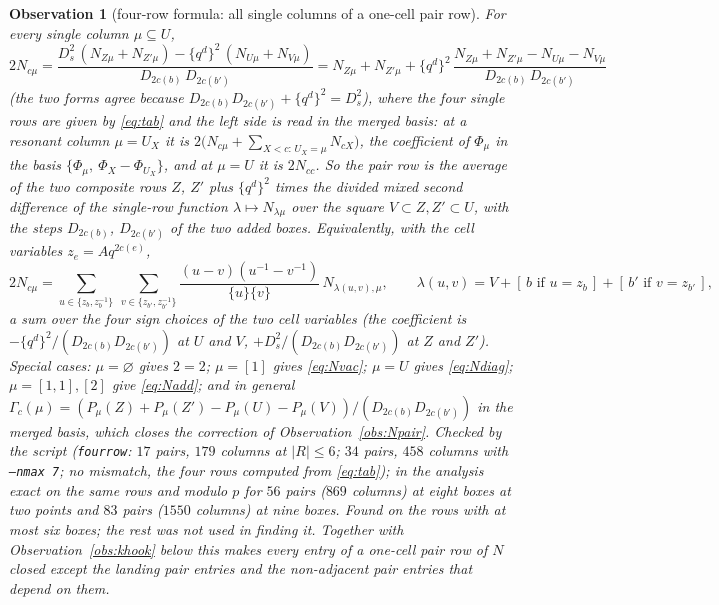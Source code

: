 \documentclass[11pt]{article}
\newtheorem{observation}{Observation}
\newcommand{\vac}{\varnothing}
\newcommand{\LMPH}[1]{\texttt{#1}}
\begin{document}
\begin{observation}[four-row formula: all single columns of a one-cell pair row]\label{obs:fourrow}
For every single column $\mu\subseteq U$,
\begin{equation}\label{eq:fourrow}
2N_{c\mu}=\frac{D_s^2\,(N_{Z\mu}+N_{Z'\mu})-\{q^d\}^2\,(N_{U\mu}+N_{V\mu})}{D_{2c(b)}\,D_{2c(b')}}
=N_{Z\mu}+N_{Z'\mu}+\{q^d\}^2\,\frac{N_{Z\mu}+N_{Z'\mu}-N_{U\mu}-N_{V\mu}}{D_{2c(b)}\,D_{2c(b')}}
\end{equation}
(the two forms agree because $D_{2c(b)}D_{2c(b')}+\{q^d\}^2=D_s^2$), where the four single rows are given by
\eqref{eq:tab} and the left side is read in the merged basis: at a resonant column $\mu=U_X$ it is
$2\bigl(N_{c\mu}+\sum_{X<c:\,U_X=\mu}N_{cX}\bigr)$, the coefficient of $\Phi_\mu$ in the basis
$\{\Phi_\mu,\ \Phi_X-\Phi_{U_X}\}$, and at $\mu=U$ it is $2N_{cc}$.  So the pair row is the average of the two
composite rows $Z$, $Z'$ plus $\{q^d\}^2$ times the divided mixed second difference of the single-row function
$\lambda\mapsto N_{\lambda\mu}$ over the square $V\subset Z,Z'\subset U$, with the steps $D_{2c(b)}$, $D_{2c(b')}$ of
the two added boxes.  Equivalently, with the cell variables $z_e=Aq^{2c(e)}$,
\begin{equation}\label{eq:signflip}
2N_{c\mu}=\sum_{u\in\{z_b,z_b^{-1}\}}\ \sum_{v\in\{z_{b'},z_{b'}^{-1}\}}\frac{(u-v)(u^{-1}-v^{-1})}{\{u\}\{v\}}\,
N_{\lambda(u,v),\mu},\qquad \lambda(u,v)=V+[\,b\text{ if }u=z_b\,]+[\,b'\text{ if }v=z_{b'}\,],
\end{equation}
a sum over the four sign choices of the two cell variables (the coefficient is $-\{q^d\}^2/(D_{2c(b)}D_{2c(b')})$ at
$U$ and $V$, $+D_s^2/(D_{2c(b)}D_{2c(b')})$ at $Z$ and $Z'$).  Special cases: $\mu=\vac$ gives $2=2$; $\mu=[1]$ gives
\eqref{eq:Nvac}; $\mu=U$ gives \eqref{eq:Ndiag}; $\mu=[1,1],[2]$ give \eqref{eq:Nadd}; and in general
$\Gamma_c(\mu)=(P_\mu(Z)+P_\mu(Z')-P_\mu(U)-P_\mu(V))/(D_{2c(b)}D_{2c(b')})$ in the merged basis, which closes the
correction of Observation~\ref{obs:Npair}.  Checked by the script (\LMPH{fourrow}: $17$ pairs, $179$ columns at
$|R|\le6$; $34$ pairs, $458$ columns with \LMPH{--nmax 7}; no mismatch, the four rows computed from \eqref{eq:tab});
in the analysis exact on the same rows and modulo $p$ for $56$ pairs ($869$ columns) at eight boxes at two points and
$83$ pairs ($1550$ columns) at nine boxes.  Found on the rows with at most six boxes; the rest was not used in finding
it.  Together with Observation~\ref{obs:khook} below this makes every entry of a one-cell pair row of $N$ closed except
the landing pair entries and the non-adjacent pair entries that depend on them.
\end{observation}
\end{document}
